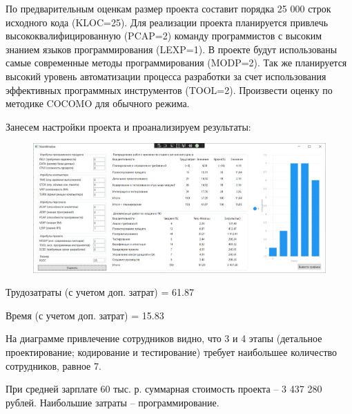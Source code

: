 По предварительным оценкам размер проекта составит порядка 25 000 строк исходного кода (KLOC=25). Для реализации проекта планируется привлечь высококвалифицированную (PCAP=2) команду программистов с высоким знанием языков программирования (LEXP=1). В проекте будут использованы самые современные методы программирования (MODP=2). Так же планируется высокий уровень автоматизации процесса разработки за счет использования эффективных программных инструментов (TOOL=2). Произвести оценку по методике COCOMO для обычного режима.

Занесем настройки проекта и проанализируем результаты:

\begin{figure}[H]
	\begin{center}
		\includegraphics[width=\textwidth]{imgs/task_2_0.png}
	\end{center}
\end{figure}

Трудозатраты (с учетом доп. затрат) = 61.87

Время (с учетом доп. затрат) = 15.83

На диаграмме привлечение сотрудников видно, что 3 и 4 этапы (детальное проектирование; кодирование и тестирование) требует наибольшее количество сотрудников, равное 7.

При средней зарплате 60 тыс. р. суммарная стоимость проекта -- 3 437 280 рублей. Наибольшие затраты -- программирование.
